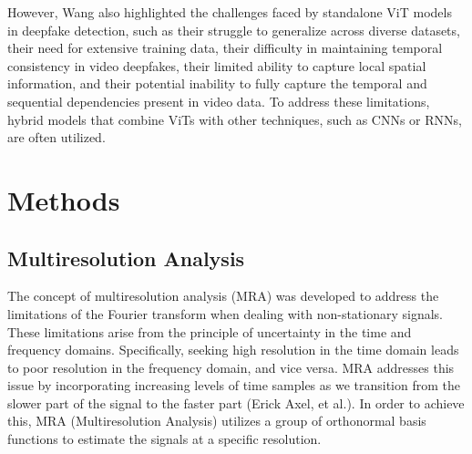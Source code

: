 \documentclass{svproc}
\begin{document}
However, Wang also highlighted the challenges faced by standalone ViT models in
deepfake detection, such as their struggle to generalize across diverse
datasets, their need for extensive training data, their difficulty in
maintaining temporal consistency in video deepfakes, their limited ability to
capture local spatial information, and their potential inability to fully
capture the temporal and sequential dependencies present in video data. To
address these limitations, hybrid models that combine ViTs with other
techniques, such as CNNs or RNNs, are often utilized.

\section{Methods}
\subsection{Multiresolution Analysis}
The concept of multiresolution analysis (MRA) was developed to address the
limitations of the Fourier transform when dealing with non-stationary signals.
These limitations arise from the principle of uncertainty in the time and
frequency domains. Specifically, seeking high resolution in the time domain
leads to poor resolution in the frequency domain, and vice versa. MRA addresses
this issue by incorporating increasing levels of time samples as we transition
from the slower part of the signal to the faster part (Erick Axel, et al.).
In order to achieve this, MRA (Multiresolution Analysis) utilizes a group of
orthonormal basis functions to estimate the signals at a specific resolution.\\


\end{document}
